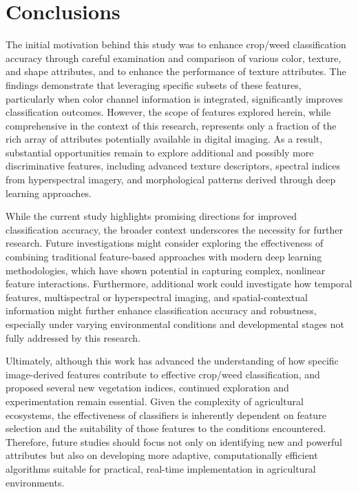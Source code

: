 \documentclass[letterpaper]{report}
\begin{document}
\section{Conclusions}
The initial motivation behind this study was to enhance crop/weed classification accuracy through careful examination and comparison of various color, texture, and shape attributes, and to enhance the performance of texture attributes. The findings demonstrate that leveraging specific subsets of these features, particularly when color channel information is integrated, significantly improves classification outcomes. However, the scope of features explored herein, while comprehensive in the context of this research, represents only a fraction of the rich array of attributes potentially available in digital imaging. As a result, substantial opportunities remain to explore additional and possibly more discriminative features, including advanced texture descriptors, spectral indices from hyperspectral imagery, and morphological patterns derived through deep learning approaches.

While the current study highlights promising directions for improved classification accuracy, the broader context underscores the necessity for further research. Future investigations might consider exploring the effectiveness of combining traditional feature-based approaches with modern deep learning methodologies, which have shown potential in capturing complex, nonlinear feature interactions. Furthermore, additional work could investigate how temporal features, multispectral or hyperspectral imaging, and spatial-contextual information might further enhance classification accuracy and robustness, especially under varying environmental conditions and developmental stages not fully addressed by this research.

Ultimately, although this work has advanced the understanding of how specific image-derived features contribute to effective crop/weed classification, and proposed several new vegetation indices, continued exploration and experimentation remain essential. Given the complexity of agricultural ecosystems, the effectiveness of classifiers is inherently dependent on feature selection and the suitability of those features to the conditions encountered. Therefore, future studies should focus not only on identifying new and powerful attributes but also on developing more adaptive, computationally efficient algorithms suitable for practical, real-time implementation in agricultural environments.
\end{document}
